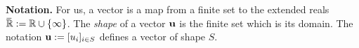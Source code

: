 \documentclass[twoside]{article}
\newcommand\discard[1]{}
\begin{document}
\textbf{Notation.}
For us, a vector is a map from a finite set to the extended reals
    $\mskip1mu\overline{\mskip-1mu\mathbb R\!}\, := \mathbb R \cup \{\infty\}$.
The \emph{shape} of a vector $\mathbf{u}$ is the finite set which is its domain.
The notation $\mathbf{u} := [u_i]_{i \in S}$ defines a vector of shape $S$.
\discard{\color{gray!30!white}
    We will sometimes use superscripts as well, especially when indices depend on one another. For example, if $\dg S$ is a finite set of finite sets, then
    $[u^S_s]^{S \in \dg S}_{s \in S}$ denotes a vector which has an element
    for each pair $(S,s)$, satisfying $s \in S \in \dg S$.
}
\end{document}
